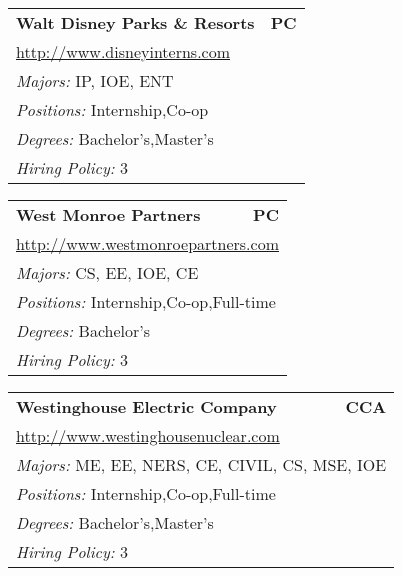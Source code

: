 \documentclass[twoside]{article}
\begin{document}
\begin{center}
\begin{multicols}{3}
\begin{FlushLeft}
\begin{minipage}{.9\columnwidth}
\end{minipage}
 
\begin{minipage}{.9\columnwidth}\begin{tabularx}{.95\columnwidth}{Xr}
                 {\Large\bf Walt Disney Parks \& Resorts} & {\Large\bf PC}\\
    \multicolumn{2}{p{.95\columnwidth}}{\url{http://www.disneyinterns.com}}\\
    \multicolumn{2}{p{.95\columnwidth}}{\emph{Majors:} IP, IOE, ENT}\\
    \multicolumn{2}{p{.95\columnwidth}}{\emph{Positions:} Internship,Co-op}\\
    \multicolumn{2}{p{.95\columnwidth}}{\emph{Degrees:} Bachelor's,Master's}\\
    \multicolumn{2}{p{.95\columnwidth}}{\emph{Hiring Policy:} 3}\\
    \end{tabularx}
    
\end{minipage}
 
\begin{minipage}{.9\columnwidth}\begin{tabularx}{.95\columnwidth}{Xr}
                 {\Large\bf West Monroe Partners} & {\Large\bf PC}\\
    \multicolumn{2}{p{.95\columnwidth}}{\url{http://www.westmonroepartners.com}}\\
    \multicolumn{2}{p{.95\columnwidth}}{\emph{Majors:} CS, EE, IOE, CE}\\
    \multicolumn{2}{p{.95\columnwidth}}{\emph{Positions:} Internship,Co-op,Full-time}\\
    \multicolumn{2}{p{.95\columnwidth}}{\emph{Degrees:} Bachelor's}\\
    \multicolumn{2}{p{.95\columnwidth}}{\emph{Hiring Policy:} 3}\\
    \end{tabularx}
    
\end{minipage}
 
\begin{minipage}{.9\columnwidth}\begin{tabularx}{.95\columnwidth}{Xr}
                 {\Large\bf Westinghouse Electric Company} & {\Large\bf CCA}\\
    \multicolumn{2}{p{.95\columnwidth}}{\url{http://www.westinghousenuclear.com}}\\
    \multicolumn{2}{p{.95\columnwidth}}{\emph{Majors:} ME, EE, NERS, CE, CIVIL, CS, MSE, IOE}\\
    \multicolumn{2}{p{.95\columnwidth}}{\emph{Positions:} Internship,Co-op,Full-time}\\
    \multicolumn{2}{p{.95\columnwidth}}{\emph{Degrees:} Bachelor's,Master's}\\
    \multicolumn{2}{p{.95\columnwidth}}{\emph{Hiring Policy:} 3}\\
    \end{tabularx}
    

\end{minipage}
\end{FlushLeft}
\end{multicols}
\end{center}
\end{document}

